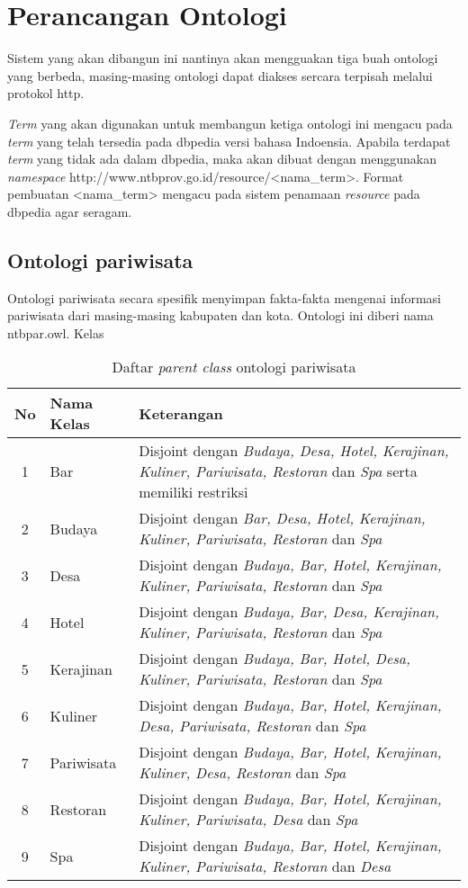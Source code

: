 \section{Perancangan Ontologi}
Sistem yang akan dibangun ini nantinya akan mengguakan tiga buah ontologi yang berbeda, masing-masing ontologi dapat diakses sercara terpisah melalui protokol http.

\emph{Term} yang akan digunakan untuk membangun ketiga ontologi ini mengacu pada \emph{term} yang telah tersedia pada dbpedia versi bahasa Indoensia. Apabila terdapat \emph{term} yang tidak ada dalam dbpedia, maka akan dibuat dengan menggunakan \emph{namespace} http://www.ntbprov.go.id/resource/<nama\_term>. Format pembuatan <nama\_term> mengacu pada sistem penamaan \emph{resource} pada dbpedia agar seragam.

\subsection{Ontologi pariwisata}
Ontologi pariwisata secara spesifik menyimpan fakta-fakta mengenai informasi pariwisata dari masing-masing kabupaten dan kota. Ontologi ini diberi nama ntbpar.owl. Kelas 

\begin{table}[tb]
	\caption{Daftar \emph{parent class} ontologi pariwisata}
	\label{tab:parent_class_ontopar}
	\centering

	\begin{tabularx}{\textwidth}{|c|l|X|}
	\hline

	\hline
	\textbf{No} & \textbf{Nama Kelas} & \textbf{Keterangan} \\
	\hline
		1 & Bar & Disjoint dengan \emph{Budaya, Desa, Hotel, Kerajinan, Kuliner, Pariwisata, Restoran} dan \emph{Spa} serta memiliki restriksi\\
	\hline
		2 & Budaya & Disjoint dengan \emph{Bar, Desa, Hotel, Kerajinan, Kuliner, Pariwisata, Restoran} dan \emph{Spa}\\
	\hline
		3 & Desa & Disjoint dengan \emph{Budaya, Bar, Hotel, Kerajinan, Kuliner, Pariwisata, Restoran} dan \emph{Spa}\\
	\hline
		4 & Hotel & Disjoint dengan \emph{Budaya, Bar, Desa, Kerajinan, Kuliner, Pariwisata, Restoran} dan \emph{Spa}\\
	\hline
		5 & Kerajinan & Disjoint dengan \emph{Budaya, Bar, Hotel, Desa, Kuliner, Pariwisata, Restoran} dan \emph{Spa}\\
	\hline
		6 & Kuliner & Disjoint dengan \emph{Budaya, Bar, Hotel, Kerajinan, Desa, Pariwisata, Restoran} dan \emph{Spa}\\
	\hline
		7 & Pariwisata & Disjoint dengan \emph{Budaya, Bar, Hotel, Kerajinan, Kuliner, Desa, Restoran} dan \emph{Spa}\\
	\hline
		8 & Restoran & Disjoint dengan \emph{Budaya, Bar, Hotel, Kerajinan, Kuliner, Pariwisata, Desa} dan \emph{Spa}\\
	\hline 
		9 & Spa & Disjoint dengan \emph{Budaya, Bar, Hotel, Kerajinan, Kuliner, Pariwisata, Restoran} dan \emph{Desa}\\
	\hline
	\end{tabularx}
\end{table}

